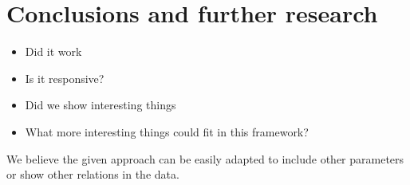 \documentclass[10pt,a4paper]{article}
\begin{document}
\section{Conclusions and further research}\label{sec:conclusions}

\begin{itemize}
    \item Did it work
    \item Is it responsive?
    \item Did we show interesting things
    \item What more interesting things could fit in this framework?
\end{itemize}

We believe the given approach can be easily adapted to include other parameters or show other relations in the data.



\end{document}
